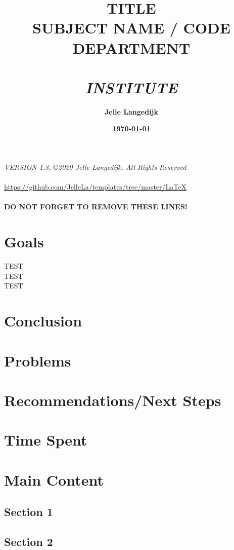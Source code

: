 \documentclass[a4paper,10pt]{article}
\title{           \textbf{TITLE} \\
                    \large{SUBJECT NAME / CODE} \\
                    \large{DEPARTMENT} \\
                    \hfill \\
                    \textit{INSTITUTE}
}
\author{\textbf{Jelle Langedijk}}
\date{\textbf{\today}}
\begin{document}
\begin{center}
\textit{VERSION 1.3, ©2020 Jelle Langedijk, All Rights Reserved } \\
\hfill \\
\url{https://github.com/JelleLa/templates/tree/master/LaTeX}\\
\hfill \\
\textbf{DO NOT FORGET TO REMOVE THESE LINES!}\\
\end{center}

\newpage


\maketitle

\section*{Goals}
TEST\\
TEST\\
TEST\\
\section*{Conclusion}
\section*{Problems}
\section*{Recommendations/Next Steps}
\section*{Time Spent}

\newpage
\section*{Main Content}
\subsection*{Section 1}
\subsection*{Section 2}
\end{document}
